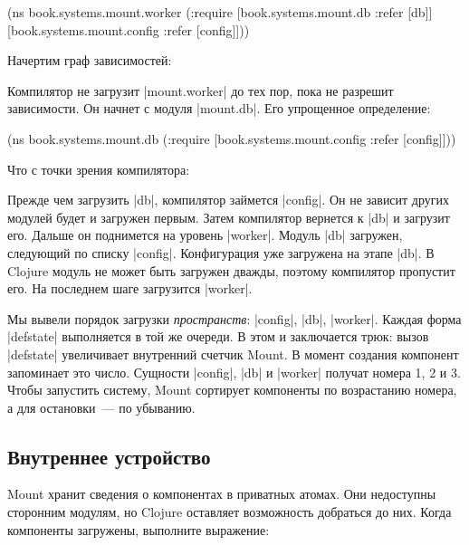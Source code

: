 \begin{english}
  \begin{clojure}
(ns book.systems.mount.worker
  (:require
   [book.systems.mount.db :refer [db]]
   [book.systems.mount.config :refer [config]]))
  \end{clojure}
\end{english}

Начертим граф зависимостей:


Компилятор не загрузит \spverb|mount.worker| до тех пор, пока не разрешит
зависимости. Он начнет с модуля \spverb|mount.db|. Его упрощенное определение:

\begin{english}
  \begin{clojure}
(ns book.systems.mount.db
  (:require
   [book.systems.mount.config :refer [config]]))
  \end{clojure}
\end{english}

Что с точки зрения компилятора:


Прежде чем загрузить \spverb|db|, компилятор займется \spverb|config|. Он не
зависит других модулей будет и загружен первым. Затем компилятор вернется к
\spverb|db| и загрузит его. Дальше он поднимется на уровень
\spverb|worker|. Модуль \spverb|db| загружен, следующий по списку
\spverb|config|. Конфигурация уже загружена на этапе \spverb|db|. В Clojure
модуль не может быть загружен дважды, поэтому компилятор пропустит его. На
последнем шаге загрузится \spverb|worker|.

Мы вывели порядок загрузки \emph{пространств}: \spverb|config|, \spverb|db|,
\spverb|worker|. Каждая форма \spverb|defstate| выполняется в той же очереди. В
этом и заключается трюк: вызов \spverb|defstate| увеличивает внутренний счетчик
Mount. В момент создания компонент запоминает это число. Сущности
\spverb|config|, \spverb|db| и \spverb|worker| получат номера 1, 2 и 3. Чтобы
запустить систему, Mount сортирует компоненты по возрастанию номера, а для
остановки~--- по убыванию.

\subsection{Внутреннее устройство}

Mount хранит сведения о компонентах в приватных атомах. Они недоступны
сторонним модулям, но Clojure оставляет возможность добраться до них. Когда
компоненты загружены, выполните выражение:

